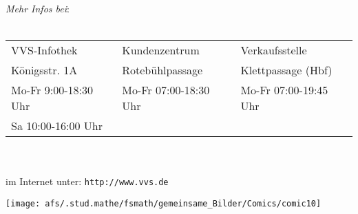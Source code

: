 
{\it Mehr Infos bei}:\\
\\
\begin{tabular}{|l|l|l|}
\hline
VVS-Infothek & Kundenzentrum & Verkaufsstelle \\
Königsstr. 1A & Rotebühlpassage & Klettpassage (Hbf)  \\
Mo-Fr  9:00-18:30 Uhr & Mo-Fr 07:00-18:30 Uhr & Mo-Fr 07:00-19:45 Uhr \\
Sa 10:00-16:00 Uhr & & \\
\hline
\end{tabular}\\
\\
im Internet unter: \verb|http://www.vvs.de|

\newpage
\vspace*{5cm}
\begin{center}
\texttt{[image: afs/.stud.mathe/fsmath/gemeinsame\_Bilder/Comics/comic10]}
\end{center}

